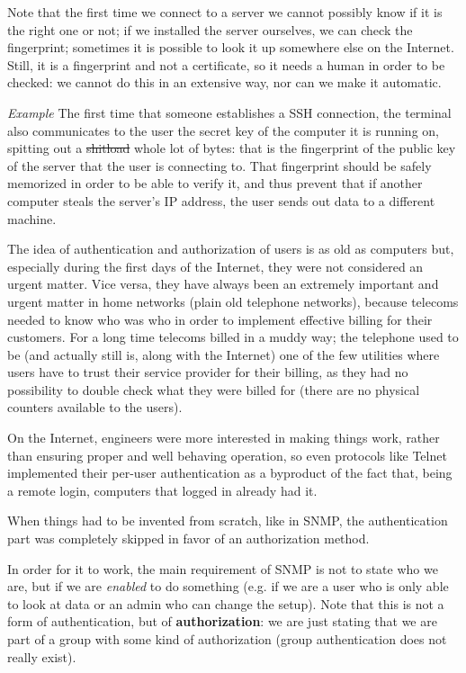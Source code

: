 Note that the first time we connect to a server we cannot possibly know if it is the right one or not; if we installed the server ourselves, we can check the fingerprint; sometimes it is possible to look it up somewhere else on the Internet. Still, it is a fingerprint and not a certificate, so it needs a human in order to be checked: we cannot do this in an extensive way, nor can we make it automatic.

\vspace{0.5em}

\emph{Example} The first time that someone establishes a SSH connection, the terminal also communicates to the user the secret key of the computer it is running on, spitting out a \sout{shitload} whole lot of bytes: that is the fingerprint of the public key of the server that the user is connecting to. That fingerprint should be safely memorized in order to be able to verify it, and thus prevent that if another computer steals the server’s IP address, the user sends out data to a different machine.

\vspace{0.5em}

The idea of authentication and authorization of users is as old as computers but, especially during the first days of the Internet, they were not considered an urgent matter. Vice versa, they have always been an extremely important and urgent matter in home networks (plain old telephone networks), because telecoms needed to know who was who in order to implement effective billing for their customers. For a long time telecoms billed in a muddy way; the telephone used to be (and actually still is, along with the Internet) one of the few utilities where users have to trust their service provider for their billing, as they had no possibility to double check what they were billed for (there are no physical counters available to the users).
 
On the Internet, engineers were more interested in making things work, rather than ensuring proper and well behaving operation, so even protocols like Telnet implemented their per-user authentication as a byproduct of the fact that, being a remote login, computers that logged in already had it.

When things had to be invented from scratch, like in SNMP, the authentication part was completely skipped in favor of an authorization method.

In order for it to work, the main requirement of SNMP is not to state who we are, but if we are \textit{enabled} to do something (e.g. if we are a user who is only able to look at data or an admin who can change the setup). Note that this is not a form of authentication, but of \textbf{authorization}: we are just stating that we are part of a group with some kind of authorization (group authentication does not really exist).

